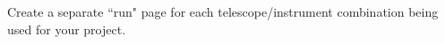 \documentclass[11pt]{article}
\begin{document}

%

\technicaldescription
Create a separate ``run" page for each telescope/instrument combination being used for your project.  



%
%

\begin{configuration}
\grating{-}
\order{-}
\crossdisperser{-}       
\slit{-}
\multislit{-}            
\wstart{-}
\wend{-}
\cable{-}
\corrector{-}            
\collimator{-}             
\adc{-}
\end{configuration}
\end{document}
